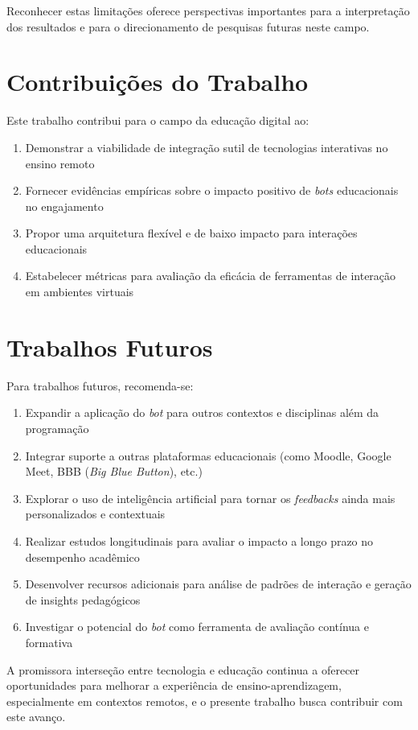 Reconhecer estas limitações oferece perspectivas importantes para a
interpretação dos resultados e para o direcionamento de pesquisas futuras neste
campo.

\section{Contribuições do Trabalho}
\label{sec:contribuicoes}

Este trabalho contribui para o campo da educação digital ao:

\begin{enumerate}
\item Demonstrar a viabilidade de integração sutil de tecnologias interativas no
ensino remoto
\item Fornecer evidências empíricas sobre o impacto positivo de \textit{bots} 
educacionais no engajamento
\item Propor uma arquitetura flexível e de baixo impacto para interações
educacionais
\item Estabelecer métricas para avaliação da eficácia de ferramentas de
interação em ambientes virtuais
\end{enumerate}

\section{Trabalhos Futuros}
\label{sec:trabalhos-futuros}

Para trabalhos futuros, recomenda-se:

\begin{enumerate}
\item Expandir a aplicação do \textit{bot} para outros contextos e disciplinas
além da programação
\item Integrar suporte a outras plataformas educacionais (como Moodle, Google
Meet, BBB (\textit{Big Blue Button}), etc.)
\item Explorar o uso de inteligência artificial para tornar os
\textit{feedbacks} ainda mais personalizados e contextuais
\item Realizar estudos longitudinais para avaliar o impacto a longo prazo no
desempenho acadêmico
\item Desenvolver recursos adicionais para análise de padrões de interação e
geração de insights pedagógicos
\item Investigar o potencial do \textit{bot} como ferramenta de avaliação
contínua e formativa
\end{enumerate}

A promissora interseção entre tecnologia e educação continua a oferecer
oportunidades para melhorar a experiência de ensino-aprendizagem, especialmente
em contextos remotos, e o presente trabalho busca contribuir com este avanço.
